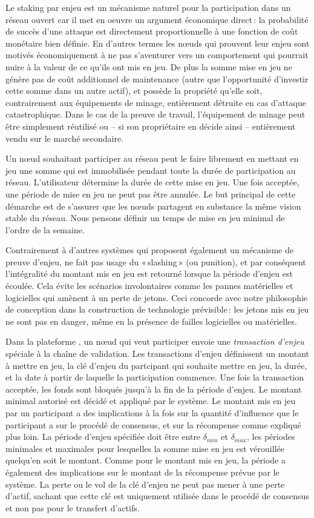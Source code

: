 \documentclass[runningheads,francais,a4paper]{llncs}
\begin{document}
Le staking par enjeu est un mécanisme naturel pour la participation dans un réseau ouvert car il met en oeuvre un
argument économique direct\,: la probabilité de succès d'une attaque est directement proportionnelle à une fonction de
coût monétaire bien définie. En d'autres termes les nœuds qui prouvent leur enjeu sont motivés économiquement à ne pas
s'aventurer vers un comportement qui pourrait nuire à la valeur de ce qu'ils ont mis en jeu. De plus la somme mise en
jeu ne génère pas de coût additionnel de maintenance (autre que l'opportunité d'investir cette somme dans un autre
actif), et possède la propriété qu'elle soit, contrairement aux équipements de minage, entièrement détruite en cas
d'attaque catastrophique. Dans le cas de la preuve de travail, l'équipement de minage peut être simplement réutilisé ou
-- si son propriétaire en décide ainsi -- entièrement vendu sur le marché secondaire.

Un nœud souhaitant participer au réseau peut le faire librement en mettant en jeu une somme qui est immobilisée pendant
toute la durée de participation au réseau. L'utilisateur détermine la durée de cette mise en jeu. Une fois acceptée, une
période de mise en jeu ne peut pas être annulée. Le but principal de cette démarche est de s'assurer que les nœuds
partagent en substance la même vision stable du réseau. Nous pensons définir un temps de mise en jeu minimal de l'ordre
de la semaine.

Contrairement à d'autres systèmes qui proposent également un mécanisme de preuve d'enjeu, \AVATokenName{} ne fait pas
usage du «\,slashing\,» (ou punition), et par conséquent l'intégralité du montant mis en jeu est retourné lorsque la
période d'enjeu est écoulée. Cela évite les scénarios involontaires comme les pannes matérielles et logicielles qui
amènent à un perte de jetons. Ceci concorde avec notre philosophie de conception dans la construction de technologie
prévisible\,: les jetons mis en jeu ne sont pas en danger, même en la présence de failles logicielles ou matérielles.

Dans la plateforme \AVAPlatformName, un nœud qui veut participer envoie une \emph{transaction d'enjeu} spéciale à la
chaîne de validation. Les transactions d'enjeu définissent un montant à mettre en jeu, la clé d'enjeu du partcipant qui
souhaite mettre en jeu, la durée, et la date à partir de laquelle la participation commence. Une fois la transaction
acceptée, les fonds sont bloqués jusqu'à la fin de la période d'enjeu. Le montant minimal autorisé est décidé et
appliqué par le système. Le montant mis en jeu par un participant a des implications à la fois sur la quantité
d'influence que le participant a sur le procédé de consensus, et sur la récompense comme expliqué plus loin.
La période d'enjeu spécifiée doit être entre $\delta_{min}$ et $\delta_{max}$, les périodes minimales et maximales pour
lesquelles la somme mise en jeu est vérouillée quelqu'en soit le montant. Comme pour le montant mis en jeu, la période
a également des implications sur le montant de la récompense prévue par le système. La perte ou le vol de la clé
d'enjeu ne peut pas mener à une perte d'actif, sachant que cette clé est uniquement utilisée dans le procédé de
consensus et non pas pour le transfert d'actifs.
\end{document}
